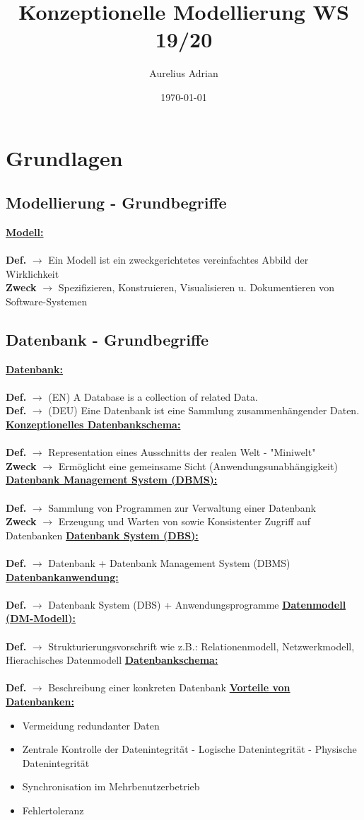 \documentclass{article}
\title{Konzeptionelle Modellierung WS 19/20}
\author{Aurelius Adrian}
\date{\today}
\newcommand{\KW}[1]{\indexspace\textbf{\underline{#1:}} \\}
\newcommand{\Def}[2]{\indexspace\textbf{\underline{#1:}} \\ \\\textbf{Def.} $\rightarrow$ {#2}}
\newcommand{\DApp}[2]{\textbf{#1} $\rightarrow$ {#2}}
\begin{document}
    \maketitle
    \tableofcontents

    \newpage
    \section{Grundlagen}
    \subsection{Modellierung - Grundbegriffe}
    \Def{Modell}{Ein Modell ist ein zweckgerichtetes vereinfachtes Abbild der Wirklichkeit} \\
    \DApp{Zweck}{Spezifizieren, Konstruieren, Visualisieren u. Dokumentieren von Software-Systemen}
    \subsection{Datenbank - Grundbegriffe}
    \Def{Datenbank}{(EN) A Database is a collection of related Data.} \\
    \DApp{Def.}{(DEU) Eine Datenbank ist eine Sammlung zusammenhängender Daten.} \\
    \Def{Konzeptionelles Datenbankschema}{Representation eines Ausschnitts der realen Welt - "Miniwelt"} \\
    \DApp{Zweck}{Ermöglicht eine gemeinsame Sicht (Anwendungsunabhängigkeit)} \\
    \Def{Datenbank Management System (DBMS)}{Sammlung von Programmen zur Verwaltung einer Datenbank} \\
    \DApp{Zweck}{Erzeugung und Warten von sowie Konsistenter Zugriff auf Datenbanken}
    \Def{Datenbank System (DBS)}{Datenbank + Datenbank Management System (DBMS)}
    \Def{Datenbankanwendung}{Datenbank System (DBS) + Anwendungsprogramme}
    \Def{Datenmodell (DM-Modell)}{Strukturierungsvorschrift wie z.B.: Relationenmodell, Netzwerkmodell, Hierachisches Datenmodell}
    \Def{Datenbankschema}{Beschreibung einer konkreten Datenbank}
    \KW{Vorteile von Datenbanken}
    \begin{itemize}
        \item Vermeidung redundanter Daten
        \item Zentrale Kontrolle der Datenintegrität
        \subitem - Logische Datenintegrität
        \subitem - Physische Datenintegrität
        \item Synchronisation im Mehrbenutzerbetrieb
        \item Fehlertoleranz
    \end{itemize}
\end{document}

